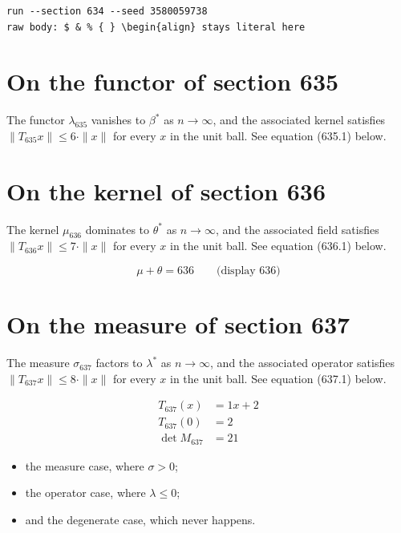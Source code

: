 \documentclass{article}
\begin{document}
\begin{verbatim}
run --section 634 --seed 3580059738
raw body: $ & % { } \begin{align} stays literal here
\end{verbatim}

\section{On the functor of section 635}
The functor $\lambda_{635}$ vanishes to $\beta^{*}$ as $n \to \infty$,
and the associated kernel satisfies $\|T_{635} x\| \leq 6 \cdot \|x\|$
for every $x$ in the unit ball. See equation (635.1) below.

\section{On the kernel of section 636}
The kernel $\mu_{636}$ dominates to $\theta^{*}$ as $n \to \infty$,
and the associated field satisfies $\|T_{636} x\| \leq 7 \cdot \|x\|$
for every $x$ in the unit ball. See equation (636.1) below.

$$
\mu + \theta = 636 \qquad \text{(display 636)}
$$

\section{On the measure of section 637}
The measure $\sigma_{637}$ factors to $\lambda^{*}$ as $n \to \infty$,
and the associated operator satisfies $\|T_{637} x\| \leq 8 \cdot \|x\|$
for every $x$ in the unit ball. See equation (637.1) below.

\begin{align}
T_{637}(x) &= 1 x + 2 \\
T_{637}(0) &= 2 \\
\det M_{637} &= 21
\end{align}

\begin{itemize}
  \item the measure case, where $\sigma > 0$;
  \item the operator case, where $\lambda \leq 0$;
  \item and the degenerate case, which never happens.
\end{itemize}
\end{document}

